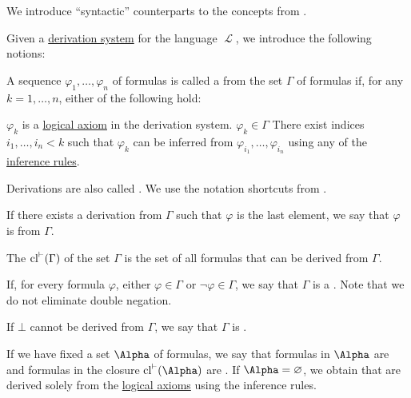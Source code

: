 \begin{definition}\label{def:first_order_proofs}
  We introduce \enquote{syntactic} counterparts to the concepts from .

  Given a \hyperref[def:first_order_derivation_system]{derivation system} for the language \( \mscrL \), we introduce the following notions:
  \begin{DefEnum}
    A sequence \( \varphi_1, \ldots, \varphi_n \) of formulas is called a  from the set \( \Gamma \) of formulas if, for any \( k = 1, \ldots, n \), either of the following hold:
    \begin{DefEnum}
       \( \varphi_k \) is a \hyperref[def:first_order_derivation_system/axioms]{logical axiom} in the derivation system.
       \( \varphi_k \in \Gamma \)
       There exist indices \( i_1, \ldots, i_n < k \) such that \( \varphi_k \) can be inferred from \( \varphi_{i_1}, \ldots, \varphi_{i_n} \) using any of the \hyperref[def:first_order_derivation_system/rules]{inference rules}.
    \end{DefEnum}

    Derivations are also called . We use the notation shortcuts from .

     If there exists a derivation from \( \Gamma \) such that \( \varphi \) is the last element, we say that \( \varphi \) is  from \( \Gamma \).

     The  \( \operatorname{cl}^{\vdash}(\Gamma) \) of the set \( \Gamma \) is the set of all formulas that can be derived from \( \Gamma \).

    If, for every formula \( \varphi \), either \( \varphi \in \Gamma \) or \( \neg \varphi \in \Gamma \), we say that \( \Gamma \) is a . Note that we do not eliminate double negation.

    If \( \bot \) cannot be derived from \( \Gamma \), we say that \( \Gamma \) is .

     If we have fixed a set \( \Alpha \) of formulas, we say that formulas in \( \Alpha \) are  and formulas in the closure \( \Cl^{\vdash}(\Alpha) \) are . If \( \Alpha = \varnothing \), we obtain  that are derived solely from the \hyperref[def:first_order_derivation_system/axioms]{logical axioms} using the inference rules.
  \end{DefEnum}
\end{definition}

